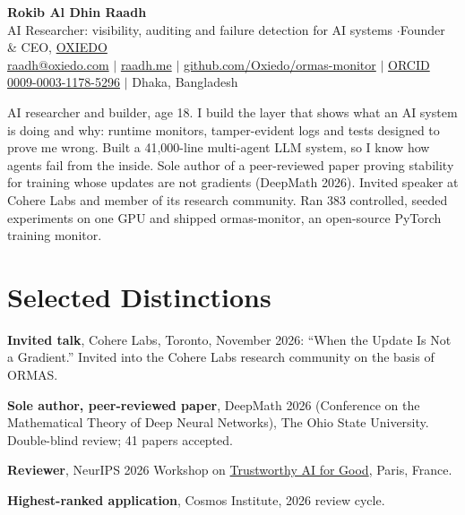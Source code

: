 \documentclass[10pt,a4paper]{article}
\begin{document}
\RaggedRight
\color{body}

\begin{center}
  {\LARGE\bfseries\color{heading} Rokib Al Dhin Raadh}\\[3pt]
  {\small AI Researcher: visibility, auditing and failure detection for AI systems \enspace$\cdot$\enspace Founder \& CEO, \href{https://oxiedo.com}{OXIEDO}}\\[3pt]
  {\footnotesize
    \href{mailto:raadh@oxiedo.com}{raadh@oxiedo.com}
    \enspace$|$\enspace
    \href{https://www.raadh.me}{raadh.me}
    \enspace$|$\enspace
    \href{https://github.com/Oxiedo/ormas-monitor}{github.com/Oxiedo/ormas-monitor}
    \enspace$|$\enspace
    \href{https://orcid.org/0009-0003-1178-5296}{ORCID 0009-0003-1178-5296}
    \enspace$|$\enspace
    {\color{muted}Dhaka, Bangladesh}
  }
\end{center}
\vspace{1pt}

{\small\noindent AI researcher and builder, age 18. I build the layer that shows what an AI system is doing and why: runtime monitors, tamper-evident logs and tests designed to prove me wrong. Built a 41,000-line multi-agent LLM system, so I know how agents fail from the inside. Sole author of a peer-reviewed paper proving stability for training whose updates are not gradients (DeepMath 2026). Invited speaker at Cohere Labs and member of its research community. Ran 383 controlled, seeded experiments on one GPU and shipped ormas-monitor, an open-source PyTorch training monitor.\par}

\section*{Selected Distinctions}
\begin{bullets}
  \item \textbf{Invited talk}, Cohere Labs, Toronto, November 2026: ``When the Update Is Not a Gradient.'' Invited into the Cohere Labs research community on the basis of ORMAS.
  \item \textbf{Sole author, peer-reviewed paper}, DeepMath 2026 (Conference on the Mathematical Theory of Deep Neural Networks), The Ohio State University. Double-blind review; 41 papers accepted.
  \item \textbf{Reviewer}, NeurIPS 2026 Workshop on \href{https://trustworthy-ai-for-good.github.io/}{Trustworthy AI for Good}, Paris, France.
  \item \textbf{Highest-ranked application}, Cosmos Institute, 2026 review cycle.
\end{bullets}
\end{document}
